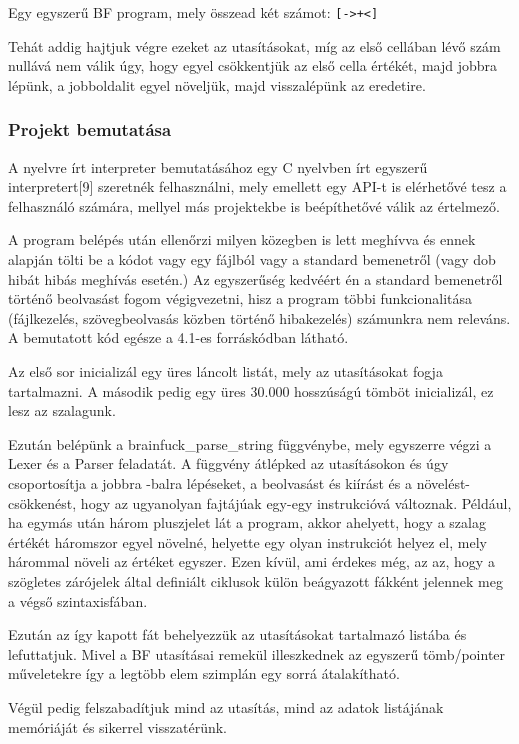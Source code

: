Egy egyszerű BF program, mely összead két számot: \verb|[->+<]|

Tehát addig hajtjuk végre ezeket az utasításokat, míg az első cellában lévő szám nullává nem válik úgy, hogy egyel csökkentjük az első cella értékét, majd jobbra lépünk, a jobboldalit egyel növeljük, majd visszalépünk az eredetire.

\subsubsection{Projekt bemutatása}

A nyelvre írt interpreter bemutatásához egy C nyelvben írt egyszerű interpretert[9] szeretnék felhasználni, mely emellett egy API-t is elérhetővé tesz a felhasználó számára, mellyel más projektekbe is beépíthetővé válik az értelmező.

A program belépés után ellenőrzi milyen közegben is lett meghívva és ennek alapján tölti be a kódot vagy egy fájlból vagy a standard bemenetről (vagy dob hibát hibás meghívás esetén.) Az egyszerűség kedvéért én a standard bemenetről történő beolvasást fogom végigvezetni, hisz a program többi funkcionalitása (fájlkezelés, szövegbeolvasás közben történő hibakezelés) számunkra nem releváns. A bemutatott kód egésze a 4.1-es forráskódban látható.

Az első sor inicializál egy üres láncolt listát, mely az utasításokat fogja tartalmazni. A második pedig egy üres 30.000 hosszúságú tömböt inicializál, ez lesz az szalagunk. 

Ezután belépünk a brainfuck\_parse\_string függvénybe, mely egyszerre végzi a Lexer és a Parser feladatát. A függvény átlépked az utasításokon és úgy csoportosítja a jobbra -balra lépéseket, a beolvasást és kiírást és a növelést-csökkenést, hogy az ugyanolyan fajtájúak egy-egy instrukcióvá változnak. Például, ha egymás után három pluszjelet lát a program, akkor ahelyett, hogy a szalag értékét háromszor egyel növelné, helyette egy olyan instrukciót helyez el, mely hárommal növeli az értéket egyszer. Ezen kívül, ami érdekes még, az az, hogy a szögletes zárójelek által definiált ciklusok külön beágyazott fákként jelennek meg a végső szintaxisfában.

Ezután az így kapott fát behelyezzük az utasításokat tartalmazó listába és lefuttatjuk. Mivel a BF utasításai remekül illeszkednek az egyszerű tömb/pointer műveletekre így a legtöbb elem szimplán egy sorrá átalakítható.

Végül pedig felszabadítjuk mind az utasítás, mind az adatok listájának memóriáját és sikerrel visszatérünk.

